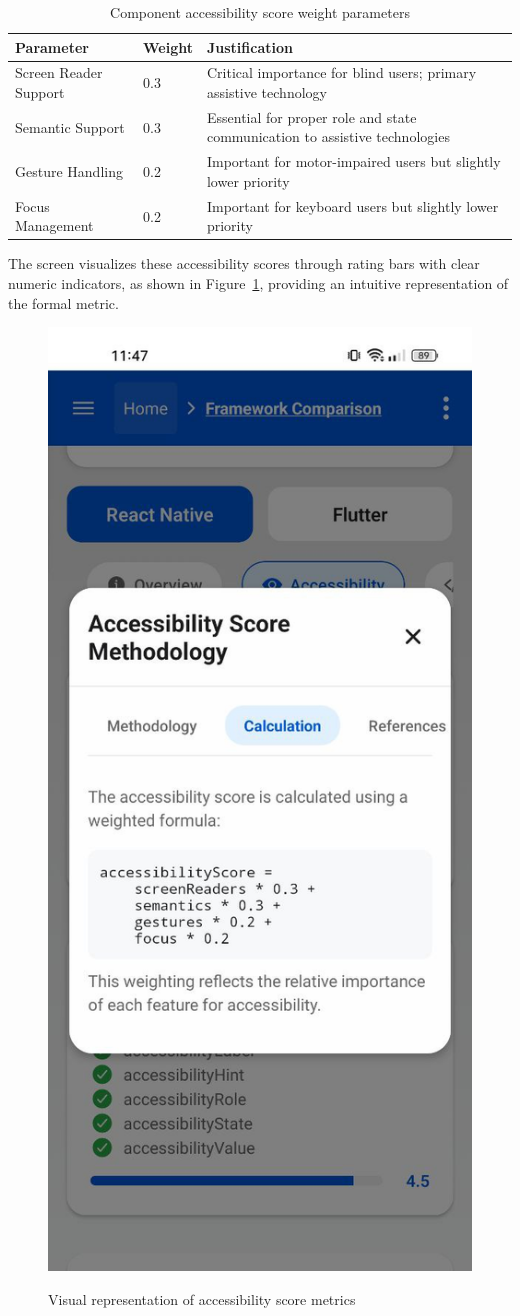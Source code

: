 {\begin{table}[ht]
\caption{Component accessibility score weight parameters}
\label{tab:metric_weight_parameters}
\centering
\begin{tabular}{|C{3.5cm}|C{2.5cm}|C{7cm}|}
\hline
\textbf{Parameter} & \textbf{Weight} & \textbf{Justification} \\
\hline
Screen Reader Support & 0.3 & Critical importance for blind users; primary assistive technology \\
\hline
Semantic Support & 0.3 & Essential for proper role and state communication to assistive technologies \\
\hline
Gesture Handling & 0.2 & Important for motor-impaired users but slightly lower priority \\
\hline
Focus Management & 0.2 & Important for keyboard users but slightly lower priority \\
\hline
\end{tabular}
\end{table}

\FloatBarrier

The screen visualizes these accessibility scores through rating bars with clear numeric indicators, as shown in Figure~\ref{fig:accessibility_rating_bars}, providing an intuitive representation of the formal metric.

\begin{figure}[ht]
    \centering
    \includegraphics[width=0.4\linewidth, alt={Screen reader support comparison methodology}]{img/accessibility-calculation.jpg}
    \caption{Visual representation of accessibility score metrics}
    \label{fig:accessibility_rating_bars}
\end{figure}

}
